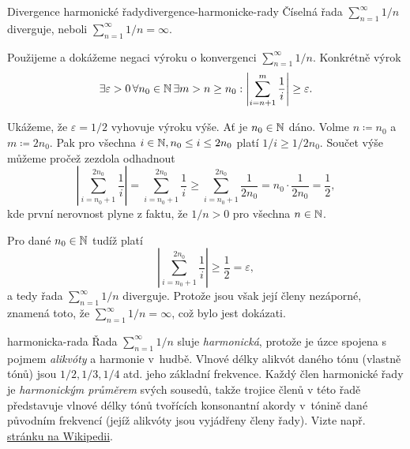 \begin{lemma}{Divergence harmonické řady}{divergence-harmonicke-rady} Číselná
 řada $\sum_{n=1}^{\infty} 1 / n$ diverguje, neboli $\sum_{n=1}^{\infty} 1 / n =
 \infty$.
\end{lemma}
\begin{lemproof}
 Použijeme  a dokážeme
 negaci výroku o konvergenci $\sum_{n=1}^{\infty} 1 / n$. Konkrétně výrok
 \[
  \exists \varepsilon>0 \, \forall n_0 \in \mathbb{N} \, \exists m > n \geq n_0: \left|
  \sum_{i=n+1}^{m} \frac{1}{i} \right| \geq \varepsilon.
 \]
 
 Ukážeme, že $\varepsilon = 1 / 2$ vyhovuje výroku výše. Ať je $n_0 \in \mathbb{N}$
 dáno. Volme $n \coloneqq n_0$ a $m \coloneqq 2n_0$. Pak pro všechna $i \in \mathbb{N},
 n_0 \leq i \leq 2n_0$ platí $1 / i \geq 1 / 2n_0$. Součet výše můžeme pročež
 zezdola odhadnout
 \[
  \left| \sum_{i=n_0+1}^{2n_0} \frac{1}{i} \right| = \sum_{i=n_0+1}^{2n_0}
  \frac{1}{i} \geq \sum_{i=n_0+1}^{2n_0} \frac{1}{2n_0} = n_0 \cdot
  \frac{1}{2n_0} = \frac{1}{2},
 \]
 kde první nerovnost plyne z faktu, že $1 / n > 0$ pro všechna $n \in \mathbb{N}$.

 Pro dané $n_0 \in \mathbb{N}$ tudíž platí
 \[
  \left| \sum_{i=n_0+1}^{2n_0} \frac{1}{i} \right| \geq \frac{1}{2} =
  \varepsilon,
 \]
 a tedy řada $\sum_{n=1}^{\infty} 1 / n$ diverguje. Protože jsou však její členy
 nezáporné, znamená toto, že $\sum_{n=1}^{\infty} 1 / n = \infty$, což bylo jest
 dokázati.
\end{lemproof}

\begin{remark}{}{harmonicka-rada}
 Řada $\sum_{n=1}^{\infty} 1 / n$ sluje \emph{harmonická}, protože je úzce
 spojena s pojmem \emph{alikvóty} a harmonie v~hud\-bě. Vlnové délky alikvót
 daného tónu (vlastně  tónů) jsou $1 / 2, 1 / 3, 1 / 4$ atd. jeho
 základní frekvence. Každý člen harmonické řady je \emph{harmonickým průměrem}
 svých sousedů, takže trojice členů v této řadě představuje vlnové délky tónů
 tvořících konsonantní akordy v~tónině dané původním frekvencí (jejíž alikvóty
 jsou vyjádřeny členy řady). Vizte např.
 \href{https://en.wikipedia.org/wiki/Harmonic_series_(mathematics)}{stránku na
 Wikipedii}.
\end{remark}

